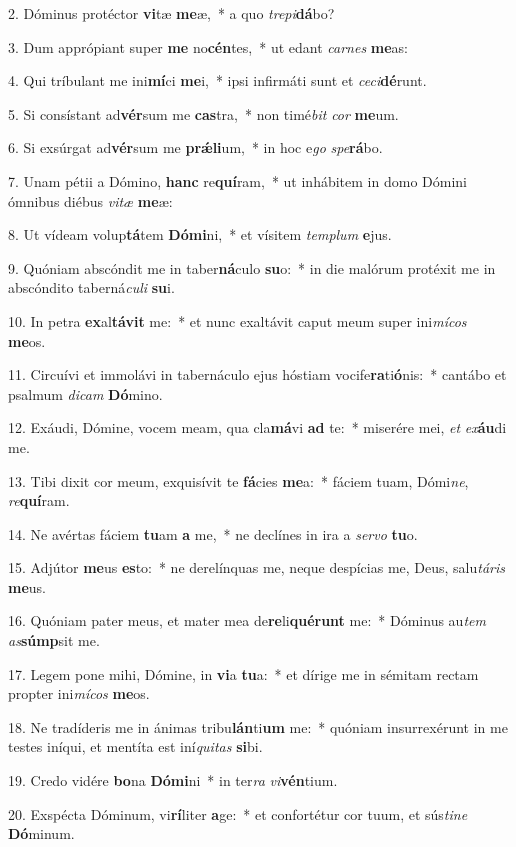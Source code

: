2. Dóminus protéctor \textbf{vi}tæ \textbf{me}æ,~*  a quo \textit{tre}\textit{pi}\textbf{dá}bo?\

3. Dum apprópiant super \textbf{me} no\textbf{cén}tes,~*  ut edant \textit{car}\textit{nes} \textbf{me}as:\

4. Qui tríbulant me ini\textbf{mí}ci \textbf{me}i,~*  ipsi infirmáti sunt et \textit{ce}\textit{ci}\textbf{dé}runt.\

5. Si consístant ad\textbf{vér}sum me \textbf{cas}tra,~*  non timé\textit{bit} \textit{cor} \textbf{me}um.\

6. Si exsúrgat ad\textbf{vér}sum me \textbf{prǽ}\textbf{li}um,~*  in hoc e\textit{go} \textit{spe}\textbf{rá}bo.\

7. Unam pétii a Dómino, \textbf{hanc} re\textbf{quí}ram,~*  ut inhábitem in domo Dómini ómnibus diébus \textit{vi}\textit{tæ} \textbf{me}æ:\

8. Ut vídeam volup\textbf{tá}tem \textbf{Dó}\textbf{mi}ni,~*  et vísitem \textit{tem}\textit{plum} \textbf{e}jus.\

9. Quóniam abscóndit me in taber\textbf{ná}culo \textbf{su}o:~*  in die malórum protéxit me in abscóndito taberná\textit{cu}\textit{li} \textbf{su}i.\

10. In petra \textbf{ex}al\textbf{tá}\textbf{vit} me:~*  et nunc exaltávit caput meum super ini\textit{mí}\textit{cos} \textbf{me}os.\

11. Circuívi et immolávi in tabernáculo ejus hóstiam vocife\textbf{ra}ti\textbf{ó}nis:~*  cantábo et psalmum \textit{di}\textit{cam} \textbf{Dó}mino.\

12. Exáudi, Dómine, vocem meam, qua cla\textbf{má}vi \textbf{ad} te:~*  miserére mei, \textit{et} \textit{ex}\textbf{áu}di me.\

13. Tibi dixit cor meum, exquisívit te \textbf{fá}cies \textbf{me}a:~*  fáciem tuam, Dómi\textit{ne}, \textit{re}\textbf{quí}ram.\

14. Ne avértas fáciem \textbf{tu}am \textbf{a} me,~*  ne declínes in ira a \textit{ser}\textit{vo} \textbf{tu}o.\

15. Adjútor \textbf{me}us \textbf{es}to:~*  ne derelínquas me, neque despícias me, Deus, salu\textit{tá}\textit{ris} \textbf{me}us.\

16. Quóniam pater meus, et mater mea de\textbf{re}li\textbf{qué}\textbf{runt} me:~*  Dóminus au\textit{tem} \textit{as}\textbf{súmp}sit me.\

17. Legem pone mihi, Dómine, in \textbf{vi}a \textbf{tu}a:~*  et dírige me in sémitam rectam propter ini\textit{mí}\textit{cos} \textbf{me}os.\

18. Ne tradíderis me in ánimas tribu\textbf{lán}ti\textbf{um} me:~*  quóniam insurrexérunt in me testes iníqui, et mentíta est iní\textit{qui}\textit{tas} \textbf{si}bi.\

19. Credo vidére \textbf{bo}na \textbf{Dó}\textbf{mi}ni~*  in ter\textit{ra} \textit{vi}\textbf{vén}tium.\

20. Exspécta Dóminum, vi\textbf{rí}liter \textbf{a}ge:~*  et confortétur cor tuum, et sús\textit{ti}\textit{ne} \textbf{Dó}minum.\

